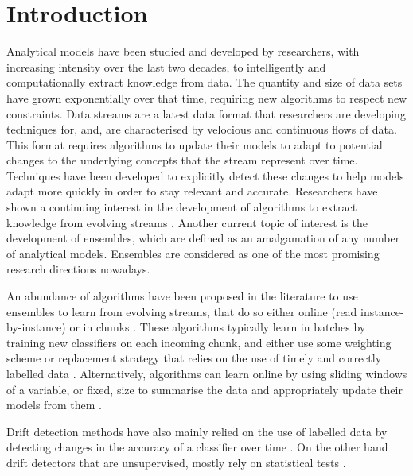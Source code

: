 \documentclass[runningheads]{llncs}
\begin{document}
\section{Introduction}
Analytical models have been studied and developed by researchers, with increasing intensity over the last two decades, to intelligently and computationally extract knowledge from data. The quantity and size of data sets have grown exponentially over that time, requiring new algorithms to respect new constraints. Data streams are a latest data format that researchers are developing techniques for, and, are characterised by velocious and continuous flows of data. This format requires algorithms to update their models to adapt to potential changes to the underlying concepts that the stream represent over time. Techniques have been developed to explicitly detect these changes to help models adapt more quickly in order to stay relevant and accurate. Researchers have shown a continuing interest in the development of algorithms to extract knowledge from evolving streams \cite{KRAWCZYK2017132, krempl2014open}. Another current topic of interest is the development of ensembles, which are defined as an amalgamation of any number of analytical models. Ensembles are considered as one of the most promising research directions nowadays.

An abundance of algorithms have been proposed in the literature to use ensembles to learn from evolving streams, that do so either online (read instance-by-instance) or in chunks \cite{KRAWCZYK2017132}. These algorithms typically learn in batches by training new classifiers on each incoming chunk, and either use some weighting scheme \cite{chu2004fast,wang2003mining} or replacement strategy that relies on the use of timely and correctly labelled data \cite{chu2004fast, street2001streaming,wang2003mining}. Alternatively, algorithms can learn online by using sliding windows of a variable, or fixed, size to summarise the data and appropriately update their models from them \cite{bifet2009new,nishida2007adaptive}.

Drift detection methods have also mainly relied on the use of labelled data by detecting changes in the accuracy of a classifier over time \cite{bifet2007learning, gama2004learning, pesaranghader2018reservoir}. On the other hand drift detectors that are unsupervised, mostly rely on statistical tests \cite{friedman1979multivariate, sheskin2003handbook, sobolewski2013concept}.
\end{document}
